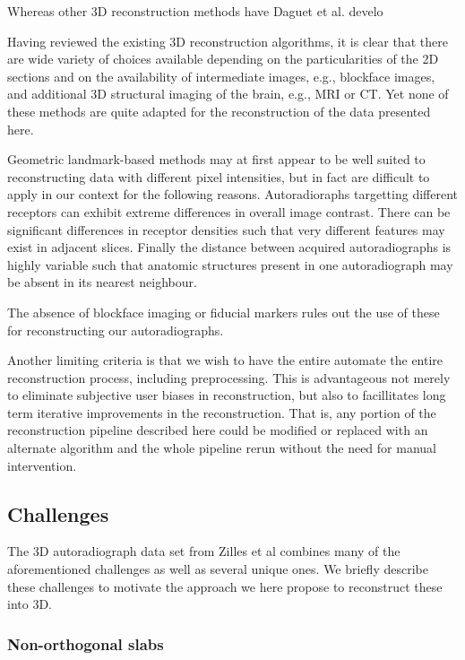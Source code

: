 \documentclass[12pt]{article}
\begin{document}
Whereas other 3D reconstruction methods have Daguet et al. develo

Having reviewed the existing 3D reconstruction algorithms, it is clear that there are wide variety of choices available depending on the particularities of the 2D sections and on the availability of intermediate images, e.g., blockface images, and additional 3D structural imaging of the brain, e.g., MRI or CT. Yet none of these methods are quite adapted for the reconstruction of the data presented here.

Geometric landmark-based methods may at first appear to be well suited to reconstructing data with different pixel intensities, but in fact are difficult to apply in our context for the following reasons. Autoradioraphs targetting different receptors can exhibit extreme differences in overall image contrast. There can be significant differences in receptor densities such that very different features may exist in adjacent slices. Finally the distance between acquired autoradiographs is highly variable such that anatomic structures present in one autoradiograph may be absent in its nearest neighbour.

The absence of blockface imaging or fiducial markers rules out the use of these for reconstructing our autoradiographs.

Another limiting criteria is that we wish to have the entire automate the entire reconstruction process, including preprocessing. This is advantageous not merely to eliminate subjective user biases in reconstruction, but also to facillitates long term iterative improvements in the reconstruction. That is, any portion of the reconstruction pipeline described here could be modified or replaced with an alternate algorithm and the whole pipeline rerun without the need for manual intervention.


\subsection{Challenges}

The 3D autoradiograph data set from Zilles et al \cite{Zilles2002} combines many of the aforementioned challenges as well as several unique ones. We briefly describe these challenges to motivate the approach we here propose to reconstruct these into 3D. 

\subsubsection{Non-orthogonal slabs}
\end{document}
